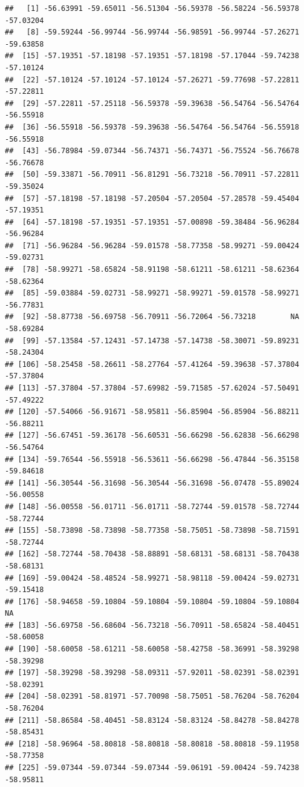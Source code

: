 \documentclass[
]{article}
\begin{document}
\begin{verbatim}
##   [1] -56.63991 -59.65011 -56.51304 -56.59378 -56.58224 -56.59378 -57.03204
##   [8] -59.59244 -56.99744 -56.99744 -56.98591 -56.99744 -57.26271 -59.63858
##  [15] -57.19351 -57.18198 -57.19351 -57.18198 -57.17044 -59.74238 -57.10124
##  [22] -57.10124 -57.10124 -57.10124 -57.26271 -59.77698 -57.22811 -57.22811
##  [29] -57.22811 -57.25118 -56.59378 -59.39638 -56.54764 -56.54764 -56.55918
##  [36] -56.55918 -56.59378 -59.39638 -56.54764 -56.54764 -56.55918 -56.55918
##  [43] -56.78984 -59.07344 -56.74371 -56.74371 -56.75524 -56.76678 -56.76678
##  [50] -59.33871 -56.70911 -56.81291 -56.73218 -56.70911 -57.22811 -59.35024
##  [57] -57.18198 -57.18198 -57.20504 -57.20504 -57.28578 -59.45404 -57.19351
##  [64] -57.18198 -57.19351 -57.19351 -57.00898 -59.38484 -56.96284 -56.96284
##  [71] -56.96284 -56.96284 -59.01578 -58.77358 -58.99271 -59.00424 -59.02731
##  [78] -58.99271 -58.65824 -58.91198 -58.61211 -58.61211 -58.62364 -58.62364
##  [85] -59.03884 -59.02731 -58.99271 -58.99271 -59.01578 -58.99271 -56.77831
##  [92] -58.87738 -56.69758 -56.70911 -56.72064 -56.73218        NA -58.69284
##  [99] -57.13584 -57.12431 -57.14738 -57.14738 -58.30071 -59.89231 -58.24304
## [106] -58.25458 -58.26611 -58.27764 -57.41264 -59.39638 -57.37804 -57.37804
## [113] -57.37804 -57.37804 -57.69982 -59.71585 -57.62024 -57.50491 -57.49222
## [120] -57.54066 -56.91671 -58.95811 -56.85904 -56.85904 -56.88211 -56.88211
## [127] -56.67451 -59.36178 -56.60531 -56.66298 -56.62838 -56.66298 -56.54764
## [134] -59.76544 -56.55918 -56.53611 -56.66298 -56.47844 -56.35158 -59.84618
## [141] -56.30544 -56.31698 -56.30544 -56.31698 -56.07478 -55.89024 -56.00558
## [148] -56.00558 -56.01711 -56.01711 -58.72744 -59.01578 -58.72744 -58.72744
## [155] -58.73898 -58.73898 -58.77358 -58.75051 -58.73898 -58.71591 -58.72744
## [162] -58.72744 -58.70438 -58.88891 -58.68131 -58.68131 -58.70438 -58.68131
## [169] -59.00424 -58.48524 -58.99271 -58.98118 -59.00424 -59.02731 -59.15418
## [176] -58.94658 -59.10804 -59.10804 -59.10804 -59.10804 -59.10804        NA
## [183] -56.69758 -56.68604 -56.73218 -56.70911 -58.65824 -58.40451 -58.60058
## [190] -58.60058 -58.61211 -58.60058 -58.42758 -58.36991 -58.39298 -58.39298
## [197] -58.39298 -58.39298 -58.09311 -57.92011 -58.02391 -58.02391 -58.02391
## [204] -58.02391 -58.81971 -57.70098 -58.75051 -58.76204 -58.76204 -58.76204
## [211] -58.86584 -58.40451 -58.83124 -58.83124 -58.84278 -58.84278 -58.85431
## [218] -58.96964 -58.80818 -58.80818 -58.80818 -58.80818 -59.11958 -58.77358
## [225] -59.07344 -59.07344 -59.07344 -59.06191 -59.00424 -59.74238 -58.95811

\end{verbatim}
\end{document}
